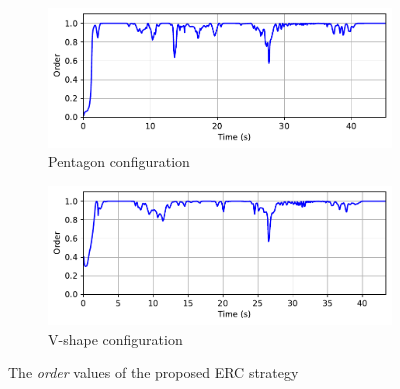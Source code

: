 \begin{figure}[!h]
\begin{subfigure}[b]{0.49\textwidth}
    
    \centering
    \includegraphics[width=\linewidth]{paper2/images/order_edc_shape1.pdf}
    \caption{Pentagon configuration}
    \label{fig:1order_edc1}
\end{subfigure}
\begin{subfigure}[b]{0.49\textwidth}
    \centering
    \includegraphics[width=\linewidth]{paper2/images/order_edc_shape2.pdf}
    \caption{V-shape configuration}
    \label{fig:1order_edc2}
\end{subfigure}
\caption{The \textit{order} values of the proposed ERC  strategy}
\label{fig:1order}
\end{figure}

